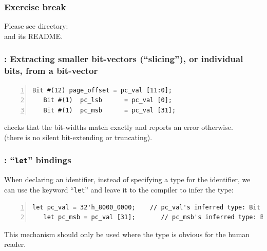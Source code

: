 
\begin{frame}
\frametitle{\EmojiExercise \hmm Exercise break}

Please see directory:  \\
and its README.

\end{frame}


\begin{frame}[fragile]
\frametitle{{\BSV}: Extracting smaller bit-vectors (``slicing''), or individual bits, from a bit-vector}

\footnotesize

\begin{Verbatim}[frame=single, numbers=left]
   Bit #(12) page_offset = pc_val [11:0];
   Bit #(1)  pc_lsb      = pc_val [0];
   Bit #(1)  pc_msb      = pc_val [31];
\end{Verbatim}

\vspace{1ex}

{\bsc} checks that the bit-widths match exactly and reports an error otherwise. \\
(there is no silent bit-extending or truncating).

\end{frame}


\begin{frame}[fragile]
\frametitle{{\BSV}: ``{\tt let}'' bindings}

\footnotesize

When declaring an identifier, instead of specifying a type for the
identifier, we can use the keyword ``{\tt let}'' and leave it to the
{\bsc} compiler to infer the type:

\vspace{2ex}

\begin{Verbatim}[frame=single, numbers=left]
   let pc_val = 32'h_8000_0000;    // pc_val's inferred type: Bit #(32) 
   let pc_msb = pc_val [31];       // pc_msb's inferred type: Bit #(1)
\end{Verbatim}

\vspace{2ex}

This mechanism should only be used where the type is obvious for the
human reader.

\end{frame}

